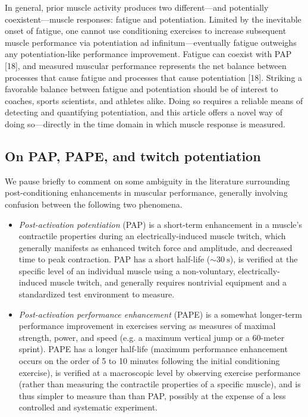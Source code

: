 \documentclass[utf8]{style/FrontiersinHarvard}
\begin{document}
In general, prior muscle activity produces two different---and potentially coexistent---muscle responses: fatigue and potentiation.
Limited by the inevitable onset of fatigue, one cannot use conditioning exercises to increase subsequent muscle performance via potentiation ad infinitum---eventually fatigue outweighs any potentiation-like performance improvement.
Fatigue can coexist with PAP [18], and measured muscular performance represents the net balance between processes that cause fatigue and processes that cause potentiation [18].
Striking a favorable balance between fatigue and potentiation should be of interest to coaches, sports scientists, and athletes alike.
Doing so requires a reliable means of detecting and quantifying potentiation, and this article offers a novel way of doing so---directly in the time domain in which muscle response is measured.

\subsection{On PAP, PAPE, and twitch potentiation}
We pause briefly to comment on some ambiguity in the literature surrounding post-conditioning enhancements in muscular performance,
generally involving confusion between the following two phenomena.
\begin{itemize}

    \item \textit{Post-activation potentiation} (PAP) is a short-term enhancement in a muscle's contractile properties during an electrically-induced muscle twitch, which generally manifests as enhanced twitch force and amplitude, and decreased time to peak contraction.
    PAP has a short half-life ($ \sim \SI{30}{\second} $),
    is verified at the specific level of an individual muscle using a non-voluntary, electrically-induced muscle twitch, and generally requires nontrivial equipment and a standardized test environment to measure.

    \item \textit{Post-activation performance enhancement} (PAPE) is
    a somewhat longer-term performance improvement in exercises serving as measures of maximal strength, power, and speed (e.g. a maximum vertical jump or a 60-meter sprint).
    PAPE has a longer half-life (maximum performance enhancement occurs on the order of 5 to 10 minutes following the initial conditioning exercise),
    is verified at a macroscopic level by observing exercise performance (rather than measuring the contractile properties of a specific muscle),
    and is thus simpler to measure than than PAP, possibly at the expense of a less controlled and systematic experiment.

\end{itemize}
\end{document}
